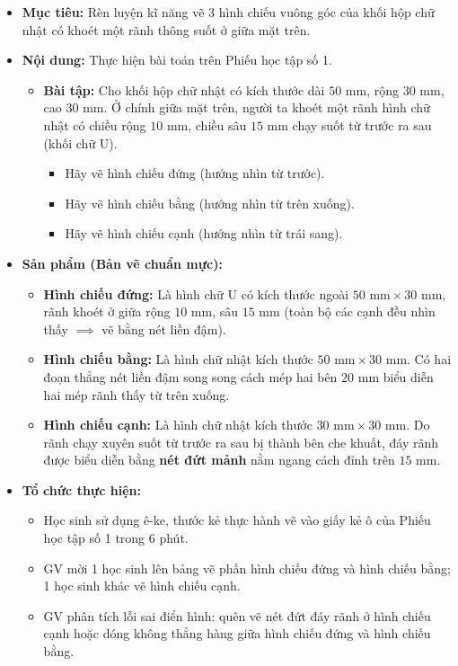\documentclass[12pt, a4paper]{article}
\begin{document}
\begin{itemize}[leftmargin=1.2cm]
    \item[a)] \textbf{Mục tiêu:} Rèn luyện kĩ năng vẽ 3 hình chiếu vuông góc của khối hộp chữ nhật có khoét một rãnh thông suốt ở giữa mặt trên.
    \item[b)] \textbf{Nội dung:} Thực hiện bài toán trên Phiếu học tập số 1.
    \begin{itemize}[leftmargin=0.6cm]
        \item \textbf{Bài tập:} Cho khối hộp chữ nhật có kích thước dài $50\text{ mm}$, rộng $30\text{ mm}$, cao $30\text{ mm}$. Ở chính giữa mặt trên, người ta khoét một rãnh hình chữ nhật có chiều rộng $10\text{ mm}$, chiều sâu $15\text{ mm}$ chạy suốt từ trước ra sau (khối chữ U).
        \begin{itemize}
            \item Hãy vẽ hình chiếu đứng (hướng nhìn từ trước).
            \item Hãy vẽ hình chiếu bằng (hướng nhìn từ trên xuống).
            \item Hãy vẽ hình chiếu cạnh (hướng nhìn từ trái sang).
        \end{itemize}
    \end{itemize}

    \item[c)] \textbf{Sản phẩm (Bản vẽ chuẩn mực):}
    \begin{itemize}[leftmargin=0.6cm]
        \item \textbf{Hình chiếu đứng:} Là hình chữ U có kích thước ngoài $50\text{ mm} \times 30\text{ mm}$, rãnh khoét ở giữa rộng $10\text{ mm}$, sâu $15\text{ mm}$ (toàn bộ các cạnh đều nhìn thấy $\implies$ vẽ bằng nét liền đậm).
        \item \textbf{Hình chiếu bằng:} Là hình chữ nhật kích thước $50\text{ mm} \times 30\text{ mm}$. Có hai đoạn thẳng nét liền đậm song song cách mép hai bên $20\text{ mm}$ biểu diễn hai mép rãnh thấy từ trên xuống.
        \item \textbf{Hình chiếu cạnh:} Là hình chữ nhật kích thước $30\text{ mm} \times 30\text{ mm}$. Do rãnh chạy xuyên suốt từ trước ra sau bị thành bên che khuất, đáy rãnh được biểu diễn bằng \textbf{nét đứt mảnh} nằm ngang cách đỉnh trên $15\text{ mm}$.
    \end{itemize}

    \item[d)] \textbf{Tổ chức thực hiện:}
    \begin{itemize}[leftmargin=0.6cm]
        \item Học sinh sử dụng ê-ke, thước kẻ thực hành vẽ vào giấy kẻ ô của Phiếu học tập số 1 trong 6 phút.
        \item GV mời 1 học sinh lên bảng vẽ phấn hình chiếu đứng và hình chiếu bằng; 1 học sinh khác vẽ hình chiếu cạnh.
        \item GV phân tích lỗi sai điển hình: quên vẽ nét đứt đáy rãnh ở hình chiếu cạnh hoặc dóng không thẳng hàng giữa hình chiếu đứng và hình chiếu bằng.
    \end{itemize}
\end{itemize}
\end{document}
